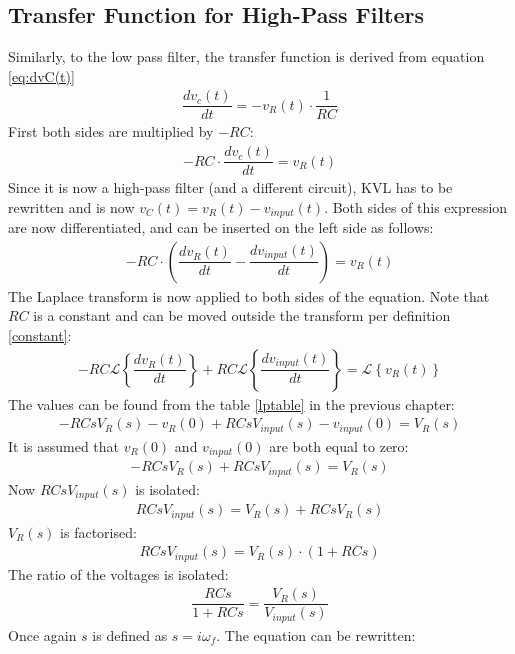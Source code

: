 \subsection{Transfer Function for High-Pass Filters}
Similarly, to the low pass filter, the transfer function is derived from equation \eqref{eq:dvC(t)} 
\begin{align}
\dfrac{dv_{c}(t)}{dt} = -v_{R}(t) \cdot \dfrac{1}{RC}
\end{align}
First both sides are multiplied by $-RC$:
\begin{align}
-RC \cdot \dfrac{dv_{c}(t)}{dt} = v_{R}(t)
\end{align}
Since it is now a high-pass filter (and a different circuit), KVL has to be rewritten and is now $v_{C}(t)=v_{R}(t)-v_{input}(t)$. Both sides of this expression are now differentiated, and can be inserted on the left side as follows:
\begin{align*}
-RC \cdot \left(\dfrac{dv_{R}(t)}{dt} - \dfrac{dv_{input}(t)}{dt} \right) = v_{R}(t)
\end{align*}
The Laplace transform is now applied to both sides of the equation. Note that $RC$ is a constant and can be moved outside the transform per definition \ref{constant}:
\begin{align*}
-RC \mathcal{L} \left\{\dfrac{dv_{R}(t)}{dt} \right\} + RC \mathcal{L} \left\{ \dfrac{dv_{input}(t)}{dt} \right\} = \mathcal{L} \left\{v_{R}(t) \right\}
\end{align*}
The values can be found from the table \ref{lptable} in the previous chapter:
\begin{align*}
-RCsV_{R}(s)-v_{R}(0) + RCsV_{input}(s)-v_{input}(0) = V_{R}(s)
\end{align*}
It is assumed that $v_{R}(0)$ and $v_{input}(0)$ are both equal to zero:
\begin{align*}
-RCsV_{R}(s) + RCsV_{input}(s) = V_{R}(s)
\end{align*}
Now $RCs V_{input}(s)$ is isolated:
\begin{align*}
RCsV_{input}(s) = V_{R}(s) + RCsV_{R}(s)
\end{align*}
$V_{R}(s)$ is factorised:
\begin{align*}
RCsV_{input}(s) = V_{R}(s) \cdot (1 + RCs)
\end{align*}
The ratio of the voltages is isolated:
\begin{align} \label{hp:visolated}
\dfrac{RCs}{1 + RCs} = \dfrac{V_{R}(s)}{V_{input}(s)}
\end{align}
Once again $s$ is defined as $s=i\omega_f$. The equation can be rewritten:
